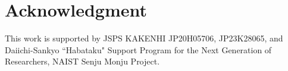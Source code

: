 \section{Acknowledgment}
\label{7_acknowledgment}

This work is supported by JSPS KAKENHI JP20H05706, JP23K28065, and Daiichi-Sankyo ``Habataku" Support Program for the Next Generation of Researchers, NAIST Senju Monju Project.